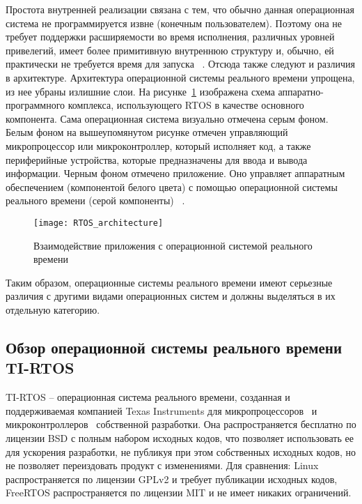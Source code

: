 Простота внутренней реализации связана с тем, что обычно данная
операционная система не программируется извне (конечным пользователем).
Поэтому она не требует поддержки расширяемости во время исполнения,
различных уровней привелегий, имеет более примитивную внутреннюю структуру
и, обычно, ей практически не требуется время для запуска ~\cite{rtos_valvano}.
Отсюда также следуют и различия в архитектуре. Архитектура операционной системы
реального времени упрощена, из нее убраны излишние слои.
На рисунке~\ref{pic:lit_review:rtos_arch} изображена схема
аппаратно-программного комплекса, использующего RTOS в качестве основного
компонента. Сама операционная система визуально отмечена серым фоном.
Белым фоном на вышеупомянутом рисунке отмечен управляющий микропроцессор
или микроконтроллер, который
исполняет код, а также периферийные устройства, которые предназначены
для ввода и вывода информации. Черным фоном отмечено приложение. Оно
управляет аппаратным обеспечением (компонентой белого цвета) с помощью
операционной системы реального времени
(серой компоненты) ~\cite{rtos_arch_site}.

\begin{figure}
    \centering
    \texttt{[image: RTOS\_architecture]}
    \caption{Взаимодействие приложения с операционной системой реального времени}
    \label{pic:lit_review:rtos_arch}

\end{figure}


Таким образом, операционные системы реального времени имеют серьезные различия
с другими видами операционных систем и должны выделяться в их отдельную
категорию.

\subsection{Обзор операционной системы реального времени TI-RTOS}

TI-RTOS -- операционная система реального времени, созданная и поддерживаемая
компанией Texas Instruments для микропроцессоров~\cite{tirtos_proc_site} и
микроконтроллеров~\cite{tirtos_mcu_site} собственной разработки. Она
распространяется бесплатно по лицензии BSD с полным набором исходных кодов,
что позволяет использовать ее для ускорения разработки,
не публикуя при этом собственных исходных кодов, но не позволяет переиздовать
продукт с изменениями. Для сравнения:
Linux распространяется по лицензии GPLv2 и требует публикации
исходных кодов, FreeRTOS распространяется по лицензии MIT и не имеет никаких
ограничений.

